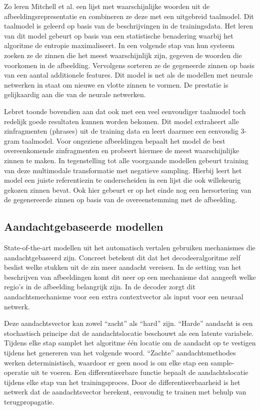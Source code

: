 Zo leren Mitchell et al.\cite{Mitchell2015} een lijst met waarschijnlijke woorden uit de afbeeldingsrepresentatie en combineren ze deze met een uitgebreid taalmodel. Dit taalmodel is geleerd op basis van de beschrijvingen in de trainingsdata. Het leren van dit model gebeurt op basis van een statistische benadering waarbij het algoritme de entropie maximaliseert. In een volgende stap van hun systeem zoeken ze de zinnen die het meest waarschijnlijk zijn, gegeven de woorden die voorkomen in de afbeelding. Vervolgens sorteren ze de gegeneerde zinnen op basis van een aantal additionele features. Dit model is net als de modellen met neurale netwerken in staat om nieuwe en vlotte zinnen te vormen. De prestatie is gelijkaardig aan die van de neurale netwerken.

Lebret \cite{Lebret2015} toonde bovendien aan dat ook met een veel eenvoudiger taalmodel toch redelijk goede resultaten kunnen worden bekomen. Dit model extraheert alle zinfragmenten (phrases) uit de training data en leert daarmee een eenvoudig 3-gram taalmodel. Voor ongeziene afbeeldingen bepaalt het model de best overeenkomende zinfragmenten en probeert hiermee de meest waarschijnlijke zinnen te maken. In tegenstelling tot alle voorgaande modellen gebeurt training van deze multimodale transformatie met negatieve sampling. Hierbij leert het model een juiste referentiezin te onderscheiden in een lijst die ook willekeurig gekozen zinnen bevat. Ook hier gebeurt er op het einde nog een hersortering van de gegenereerde zinnen op basis van de overeenstemming met de afbeelding.

\subsection{Aandachtgebaseerde modellen}
State-of-the-art modellen uit het automatisch vertalen gebruiken mechanismes die aandachtgebaseerd zijn. Concreet betekent dit dat het decodeeralgoritme zelf beslist welke stukken uit de zin meer aandacht vereisen.
In de setting van het beschrijven van afbeeldingen komt dit neer op een mechanisme dat aangeeft welke regio's in de afbeelding belangrijk zijn. In de decoder zorgt dit aandachtsmechanisme voor een extra contextvector als input voor een neuraal netwerk. 

Deze aandachtsvector kan zowel ``zacht'' als ``hard'' zijn. ``Harde'' aandacht is een stochastisch principe dat de aandachtslocatie beschouwt als een latente variabele. Tijdens elke stap samplet het algoritme \'e\'en locatie om de aandacht op te vestigen tijdens het genereren van het volgende woord. ``Zachte'' aandachtsmethodes werken deterministisch, waardoor er geen nood is om elke stap een sample-operatie uit te voeren. Een differentieerbare functie bepaalt de aandachtslocatie tijdens elke stap van het trainingsproces. Door de differentieerbaarheid is het netwerk dat de aandachtsvector berekent, eenvoudig te trainen met behulp van terugpropagatie.

